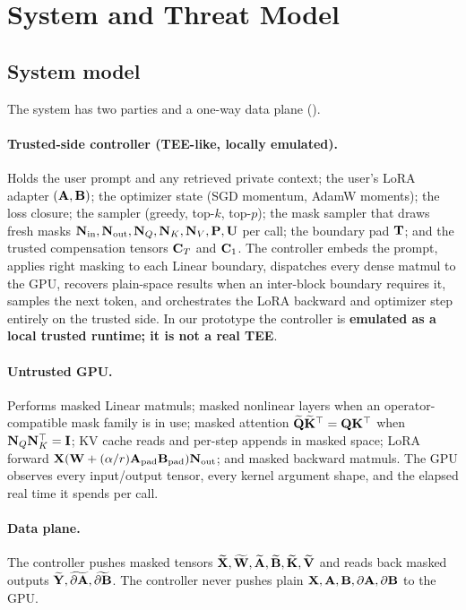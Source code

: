 \section{System and Threat Model}
\label{sec:threat}

\subsection{System model}
The system has two parties and a one-way data plane ().

\paragraph{Trusted-side controller (TEE-like, locally emulated).}
Holds the user prompt and any retrieved private context; the user's LoRA adapter $(\mathbf{A}, \mathbf{B})$; the optimizer state (SGD momentum, AdamW moments); the loss closure; the sampler (greedy, top-$k$, top-$p$); the mask sampler that draws fresh masks $\mathbf{N}_{\mathrm{in}}, \mathbf{N}_{\mathrm{out}}, \mathbf{N}_{Q}, \mathbf{N}_{K}, \mathbf{N}_{V}, \mathbf{P}, \mathbf{U}$ per call; the boundary pad $\mathbf{T}$; and the trusted compensation tensors $\mathbf{C}_{T}$ and $\mathbf{C}_{1}$. The controller embeds the prompt, applies right masking to each Linear boundary, dispatches every dense matmul to the GPU, recovers plain-space results when an inter-block boundary requires it, samples the next token, and orchestrates the LoRA backward and optimizer step entirely on the trusted side. In our prototype the controller is \textbf{emulated as a local trusted runtime; it is not a real TEE}.

\paragraph{Untrusted GPU.}
Performs masked Linear matmuls; masked nonlinear layers when an operator-compatible mask family is in use; masked attention $\widetilde{\mathbf{Q}}\widetilde{\mathbf{K}}^{\top} = \mathbf{Q}\mathbf{K}^{\top}$ when $\mathbf{N}_{Q}\mathbf{N}_{K}^{\top} = \mathbf{I}$; KV cache reads and per-step appends in masked space; LoRA forward $\mathbf{X}(\mathbf{W} + (\alpha/r)\mathbf{A}_{\mathrm{pad}}\mathbf{B}_{\mathrm{pad}})\mathbf{N}_{\mathrm{out}}$; and masked backward matmuls. The GPU observes every input/output tensor, every kernel argument shape, and the elapsed real time it spends per call.

\paragraph{Data plane.}
The controller pushes masked tensors $\widetilde{\mathbf{X}}, \widetilde{\mathbf{W}}, \widetilde{\mathbf{A}}, \widetilde{\mathbf{B}}, \widetilde{\mathbf{K}}, \widetilde{\mathbf{V}}$ and reads back masked outputs $\widetilde{\mathbf{Y}}, \widetilde{\partial \mathbf{A}}, \widetilde{\partial \mathbf{B}}$. The controller never pushes plain $\mathbf{X}, \mathbf{A}, \mathbf{B}, \partial \mathbf{A}, \partial \mathbf{B}$ to the GPU.


